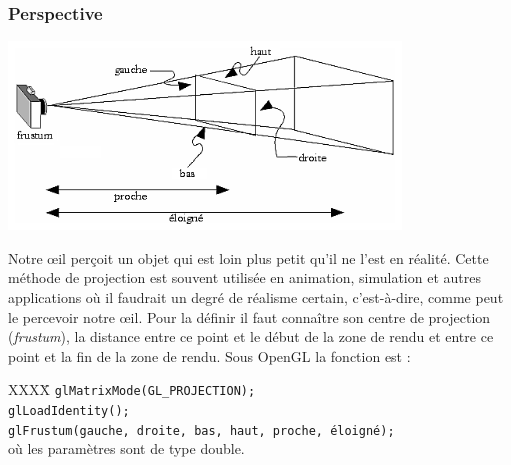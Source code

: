 \subsubsection{Perspective}
\begin{center}
	 \includegraphics[height=5cm]{img/Perspective}
 \end{center}
Notre œil perçoit un objet qui est loin plus petit qu’il ne l’est en réalité. Cette méthode de projection est souvent utilisée en animation, simulation et autres applications où il faudrait un degré de réalisme certain, c'est-à-dire, comme peut le percevoir notre œil. Pour la définir il faut connaître son centre de projection (\textit{frustum}), la distance entre ce point et le début de la zone de rendu et entre ce point et la fin de la zone de rendu. Sous OpenGL la fonction est : 
\begin{tabbing}
XXXX\= \kill
\> \verb|glMatrixMode(GL_PROJECTION);|\\
\> \verb|glLoadIdentity();|\\
\> \verb|glFrustum(gauche, droite, bas, haut, proche, éloigné);| \\où les paramètres sont de type double.
\end{tabbing}


